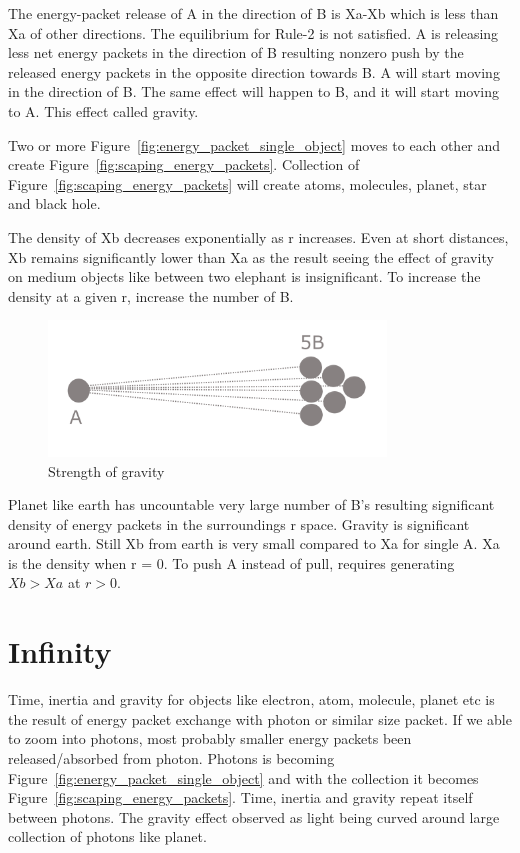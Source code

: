 \documentclass{article}
\begin{document}
    The energy-packet release of A in the direction of B is Xa-Xb which is less than Xa of other directions.
     The equilibrium for Rule-2 is not satisfied.
     A is releasing less net energy packets in the direction of B resulting nonzero push by the released energy packets in the opposite direction towards B. A will start moving in the direction of B.  The same effect will happen to B,  and it will start moving to A. This effect called gravity.

    Two or more Figure~\ref{fig:energy_packet_single_object} moves to each other and create Figure~\ref{fig:scaping_energy_packets}.
    Collection of Figure~\ref{fig:scaping_energy_packets} will create atoms, molecules, planet, star and black hole.

    The density of Xb decreases exponentially as r increases.
    Even at short distances, Xb remains significantly lower than Xa as the result seeing the effect of gravity on medium objects like between two elephant is insignificant.
    To increase the density at a given r, increase the number of B\@.

    \begin{figure}[H]
        \centering
        \includegraphics[width=0.8\textwidth]{images/gravity_multiple_B}
        \caption{Strength of gravity}
        \label{fig:gravity_multiple_B}
    \end{figure}

    Planet like earth has uncountable very large number of B's resulting significant density of energy packets in the surroundings r space.
    Gravity is significant  around earth.
    Still Xb from earth is very small compared to Xa for single A. Xa is the density when r = 0.
    To push A instead of pull, requires generating  $ Xb > Xa $ at $ r > 0 $.


    \section{Infinity}\label{sec:infinity}

    Time, inertia and gravity for objects like electron, atom, molecule, planet etc is the result of energy packet exchange with photon or  similar size packet.
     If we able to zoom into photons, most probably smaller energy packets been released/absorbed from photon.
     Photons is becoming Figure~\ref{fig:energy_packet_single_object} and with the collection it becomes Figure~\ref{fig:scaping_energy_packets}.
     Time, inertia and gravity repeat itself between photons.
     The gravity effect observed as light being curved around large collection of photons like planet.
\end{document}
